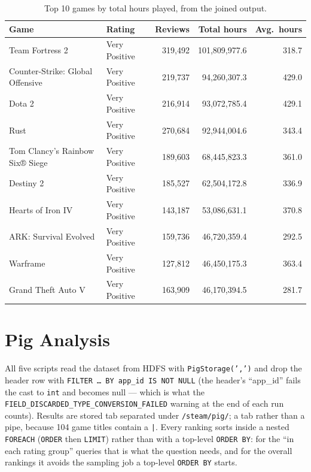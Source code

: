 \documentclass[11pt,a4paper]{article}
\newcommand{\code}[1]{\texttt{#1}}
\begin{document}
\begin{table}[H]\centering\footnotesize
\begin{tabular}{llrrr}
\toprule
Game & Rating & Reviews & Total hours & Avg.\ hours \\
\midrule
Team Fortress 2                   & Very Positive & 319,492 & 101,809,977.6 & 318.7 \\
Counter-Strike: Global Offensive  & Very Positive & 219,737 &  94,260,307.3 & 429.0 \\
Dota 2                            & Very Positive & 216,914 &  93,072,785.4 & 429.1 \\
Rust                              & Very Positive & 270,684 &  92,944,004.6 & 343.4 \\
Tom Clancy's Rainbow Six® Siege   & Very Positive & 189,603 &  68,445,823.3 & 361.0 \\
Destiny 2                         & Very Positive & 185,527 &  62,504,172.8 & 336.9 \\
Hearts of Iron IV                 & Very Positive & 143,187 &  53,086,631.1 & 370.8 \\
ARK: Survival Evolved             & Very Positive & 159,736 &  46,720,359.4 & 292.5 \\
Warframe                          & Very Positive & 127,812 &  46,450,175.3 & 363.4 \\
Grand Theft Auto V                & Very Positive & 163,909 &  46,170,394.5 & 281.7 \\
\bottomrule
\end{tabular}
\caption{Top 10 games by total hours played, from the joined output.}
\end{table}

\section{Pig Analysis}

All five scripts read the dataset from HDFS with \code{PigStorage(',')} and drop the header row with
\code{FILTER \dots\ BY app\_id IS NOT NULL} (the header's ``app\_id'' fails the cast to \code{int} and
becomes null — which is what the \code{FIELD\_DISCARDED\_\allowbreak TYPE\_\allowbreak CONVERSION\_\allowbreak FAILED} warning at the end of
each run counts). Results are stored tab separated under \code{/steam/pig/}; a tab rather than a pipe,
because 104 game titles contain a \code{|}. Every ranking sorts inside a nested \code{FOREACH}
(\code{ORDER} then \code{LIMIT}) rather than with a top-level \code{ORDER BY}: for the ``in each rating
group'' queries that is what the question needs, and for the overall rankings it avoids the sampling
job a top-level \code{ORDER BY} starts.
\end{document}

